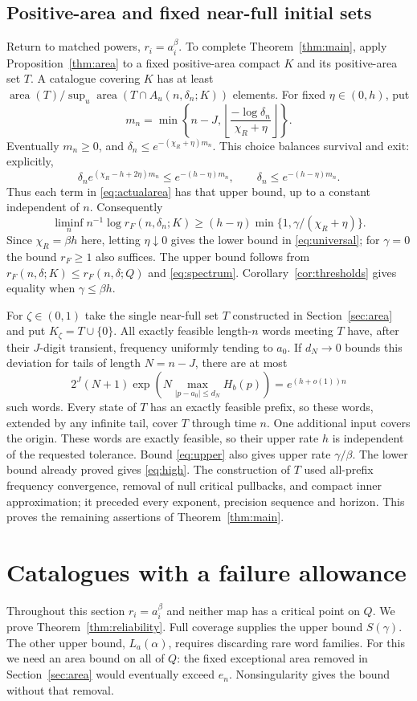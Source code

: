 \documentclass[11pt]{amsart}
\theoremstyle{definition}
\theoremstyle{remark}
\newcommand{\area}{\operatorname{area}}
\numberwithin{equation}{section}
\begin{document}
\subsection{Positive-area and fixed near-full initial sets}
Return to matched powers, $r_i=a_i^\beta$.
To complete Theorem~\ref{thm:main}, apply Proposition~\ref{thm:area}
to a fixed positive-area compact $K$ and its positive-area set $T$.
A catalogue covering $K$ has at least
$\area(T)/\sup_u\area(T\cap A_u(n,\delta_n;K))$ elements.
For fixed $\eta\in(0,h)$, put
\[
m_n=\min\left\{n-J,
 \left\lfloor\frac{-\log\delta_n}{\chi_R+\eta}\right\rfloor\right\}.
\]
Eventually $m_n\ge0$, and
$\delta_n\le e^{-(\chi_R+\eta)m_n}$.
This choice balances survival and exit: explicitly,
\[
\delta_n e^{(\chi_R-h+2\eta)m_n}
\le e^{-(h-\eta)m_n},\qquad
\delta_n\le e^{-(h-\eta)m_n}.
\]
Thus each term in \eqref{eq:actualarea} has that upper bound,
up to a constant independent of $n$. Consequently
\[
\liminf_n n^{-1}\log r_F(n,\delta_n;K)
 \ge (h-\eta)\min\{1,\gamma/(\chi_R+\eta)\}.
\]
Since $\chi_R=\beta h$ here, letting $\eta\downarrow0$
gives the lower bound in
\eqref{eq:universal}; for $\gamma=0$ the bound $r_F\ge1$
also suffices. The upper bound follows from
$r_F(n,\delta;K)\le r_F(n,\delta;Q)$ and
\eqref{eq:spectrum}. Corollary~\ref{cor:thresholds} gives equality when $\gamma\le\beta h$.

For $\zeta\in(0,1)$ take the single near-full set $T$ constructed
in Section~\ref{sec:area} and put $K_\zeta=T\cup\{0\}$.
All exactly feasible length-$n$ words meeting $T$ have,
after their $J$-digit transient, frequency uniformly tending to
$a_0$. If $d_N\to0$ bounds this deviation for tails of length
$N=n-J$, there are at most
\[
2^J(N+1)\exp\!\left(
N\max_{|p-a_0|\le d_N} H_b(p)\right)=e^{(h+o(1))n}
\]
such words. Every state of $T$ has an exactly feasible prefix,
so these words, extended by any infinite tail, cover $T$
through time $n$. One additional input covers the origin.
These words are exactly feasible, so their upper rate $h$ is
independent of the requested tolerance. Bound \eqref{eq:upper} also
gives upper rate $\gamma/\beta$. The lower bound already proved
gives \eqref{eq:high}. The construction of $T$ used all-prefix frequency convergence,
removal of null critical pullbacks, and compact inner approximation;
it preceded every exponent, precision sequence and horizon.
This proves the remaining assertions of Theorem~\ref{thm:main}.

\section{Catalogues with a failure allowance}
\label{sec:reliability}
Throughout this section $r_i=a_i^\beta$ and neither map has a
critical point on $Q$. We prove Theorem~\ref{thm:reliability}.
Full coverage supplies the upper bound $S(\gamma)$. The other
upper bound, $L_a(\alpha)$, requires discarding rare word families.
For this we need an area bound on all of $Q$: the fixed exceptional
area removed in Section~\ref{sec:area} would eventually exceed
$e_n$. Nonsingularity gives the bound without that removal.
\end{document}
